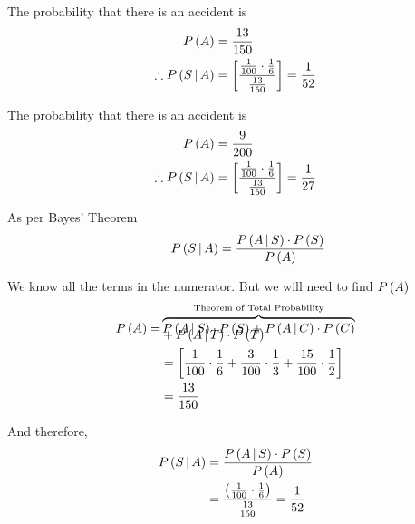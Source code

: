 \documentclass[14pt,fleqn]{extarticle}
\begin{document}
\begin{problem}
\begin{step}
\end{step}

\begin{step}
  \begin{options} 
     \correct 
     
       The probability that there is an accident is 
       \begin{align}
       P\left( A\right) &= \frac{13}{150} \\
       \therefore P\left(S\,\vert\,A\right) &= \left[ \dfrac{\frac{1}{100}\cdot\frac{1}{6}}{\frac{13}{150}}\right] =\frac{1}{52} 
\end{align}
     \incorrect
     
     The probability that there is an accident is 
       \begin{align}
       P\left( A\right) &= \frac{9}{200} \\
       \therefore P\left(S\,\vert\,A\right) &= \left[ \dfrac{\frac{1}{100}\cdot\frac{1}{6}}{\frac{13}{150}}\right] =\frac{1}{27} 
\end{align}
        
    \end{options} 
     \reason 
       
     As per Bayes' Theorem 
     \[ \qquad P\left(S\,\vert\,A\right) = \frac{P\left(A\,\vert\,S\right)\cdot P\left(S\right)}{P\left(A\right)}  \]
     
     We know all the terms in the numerator. But we will need to find $P\left( A\right)$
     \begin{align}
	P\left( A\right) = &\overbrace{P\left(A\,\vert\,S\right)\cdot P\left( S\right) + P\left(A\,\vert\,C\right)\cdot P\left( C\right)}^{\text{Theorem of Total Probability}} \\[-10pt]
	&+ P\left(A\,\vert\,T\right)\cdot P\left( T\right) \\
	&= \left[ \frac{1}{100}\cdot\frac{1}{6} + \frac{3}{100}\cdot\frac{1}{3} + \frac{15}{100}\cdot\frac{1}{2} \right] \\
	&= \frac{13}{150} 
\end{align}

And therefore, 
\begin{align}
P\left(S\,\vert\,A\right) &= \frac{P\left(A\,\vert\,S\right)\cdot P\left(S\right)}{P\left(A\right)} \\
&= \dfrac{ \left( \frac{1}{100}\cdot\frac{1}{6}\right)}{\frac{13}{150}} = \frac{1}{52}
\end{align}

\end{step}
          
\end{problem} 
\end{document}
